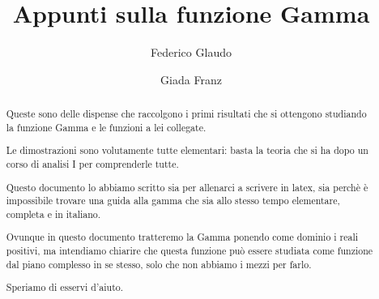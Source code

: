 \documentclass[a4paper,12pt]{article}
\title{Appunti sulla funzione Gamma}
\author{Federico Glaudo \and Giada Franz}
\begin{document}
\maketitle
\clearpage


\begin{abstract}
	Queste sono delle dispense che raccolgono i primi risultati che si ottengono
	studiando la funzione Gamma e le funzioni a lei collegate.

	Le dimostrazioni sono volutamente tutte elementari: basta la teoria che si
	ha dopo un corso di analisi I per comprenderle tutte.

	Questo documento lo abbiamo scritto sia per allenarci a scrivere in latex, sia
	perchè è impossibile trovare una guida alla gamma che sia allo stesso tempo 
	elementare, completa e in italiano.
	
	Ovunque in questo documento tratteremo la Gamma ponendo come dominio i reali positivi, ma intendiamo chiarire
	che questa funzione può essere studiata come funzione dal piano complesso in se stesso, solo che non abbiamo i mezzi per farlo.

	Speriamo di esservi d'aiuto.
\end{abstract}
\clearpage

\tableofcontents
\clearpage







\end{document}
